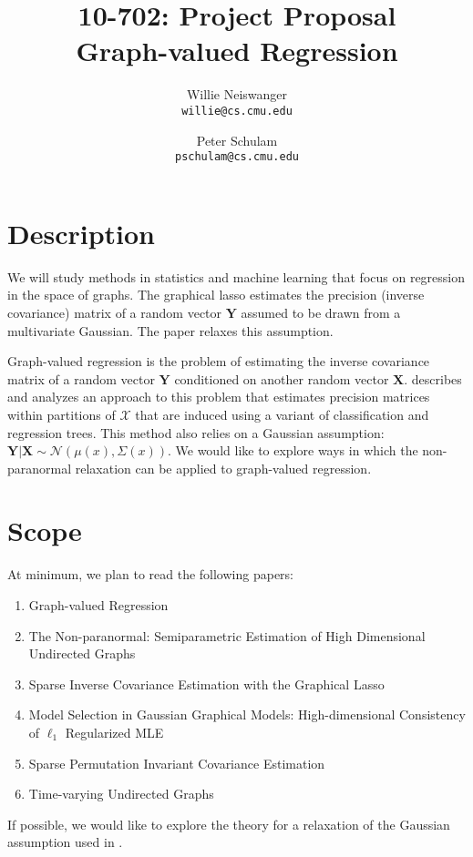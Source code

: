\documentclass[12pt]{article}
\title{10-702: Project Proposal\\
Graph-valued Regression}
\author{Willie Neiswanger\\
\texttt{willie@cs.cmu.edu}
\and
Peter Schulam\\
\texttt{pschulam@cs.cmu.edu}}
\begin{document}
\maketitle

\section{Description}
\label{sec:description}

We will study methods in statistics and machine learning that focus on
regression in the space of graphs. The graphical lasso
\cite{friedman2008} estimates the precision (inverse covariance)
matrix of a random vector $\boldsymbol{Y}$ assumed to be drawn from a
multivariate Gaussian. The paper \cite{liu2009} relaxes this
assumption.

Graph-valued regression is the problem of estimating the inverse
covariance matrix of a random vector $\boldsymbol{Y}$ conditioned on
another random vector $\boldsymbol{X}$. \cite{liu2010} describes and
analyzes an approach to this problem that estimates precision matrices
within partitions of $\boldsymbol{\mathcal{X}}$ that are induced using
a variant of classification and regression trees. This method also
relies on a Gaussian assumption: $\boldsymbol{Y} | \boldsymbol{X} \sim
\mathcal{N}(\mu(x), \Sigma(x))$. We would like to explore ways in
which the non-paranormal relaxation can be applied to graph-valued
regression.

\section{Scope}
\label{sec:scope}

At minimum, we plan to read the following papers:

\begin{enumerate}[1.]
\item Graph-valued Regression \cite{liu2010}
\item The Non-paranormal: Semiparametric Estimation of High Dimensional Undirected Graphs \cite{liu2009}
\item Sparse Inverse Covariance Estimation with the Graphical Lasso \cite{friedman2008}
\item Model Selection in Gaussian Graphical Models: High-dimensional Consistency of $\ell_1$ Regularized MLE \cite{ravikumar2008}
\item Sparse Permutation Invariant Covariance Estimation \cite{rothman2008}
\item Time-varying Undirected Graphs \cite{zhou2010}
\end{enumerate}

If possible, we would like to explore the theory for a relaxation of
the Gaussian assumption used in \cite{liu2010}.



\end{document}
